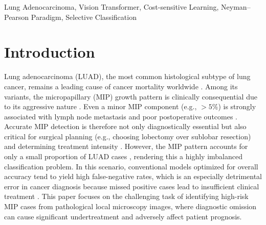 \documentclass[journal,twoside,web]{ieeecolor}
\begin{document}
\begin{abstract}
Accurate detection of the micropapillary (MIP) subtype in lung adenocarcinoma is clinically urgent due to its aggressive behavior and poor prognosis. Deep learning models, however, face deployment barriers from uncertainty and high false-negative rates (FNR). Although our baseline Vision Transformer reaches 93.41\% accuracy, its 16.06\% FNR is clinically unsafe. We first combine cost-sensitive learning (positive:negative = 10:1) with Neyman--Pearson-based threshold calibration to strictly bound the FNR at 5\%, achieving 85.91\% accuracy. We then introduce a selection head for instance-wise confidence and calibrate on a held-out set, yielding a selective classifier that guarantees 95\% per-instance confidence while maintaining FNR 12.91\%, attaining 94.82\% accuracy on 92.51\% of test data. Finally, integrating cost-sensitive learning directly into selective classification with FNR-based threshold selection further reduces FNR to 5.07\%, improves accuracy to 91.79\%, and achieves 91.02\% coverage, thereby offering a practical balance of safety and throughput for clinical deployment.
\end{abstract}

\begin{IEEEkeywords}
Lung Adenocarcinoma, Vision Transformer, Cost-sensitive Learning, Neyman--Pearson Paradigm, Selective Classification
\end{IEEEkeywords}

\section{Introduction}

Lung adenocarcinoma (LUAD), the most common histological subtype of lung cancer, remains a leading cause of cancer mortality worldwide \cite{bray2024global,luo2025estimated}. Among its variants, the micropapillary (MIP) growth pattern is clinically consequential due to its aggressive nature \cite{wang2020both,travis20152015}. Even a minor MIP component (e.g., $>5\%$) is strongly associated with lymph node metastasis and poor postoperative outcomes \cite{caso2020underlying, dai2017tumor}. Accurate MIP detection is therefore not only diagnostically essential but also critical for surgical planning (e.g., choosing lobectomy over sublobar resection) and determining treatment intensity \cite{dai2017tumor}. However, the MIP pattern accounts for only a small proportion of LUAD cases \cite{emoto2019expansion}, rendering this a highly imbalanced classification problem. In this scenario, conventional models optimized for overall accuracy tend to yield high false-negative rates, which is an especially detrimental error in cancer diagnosis because missed positive cases lead to insufficient clinical treatment \cite{araf2024cost}. This paper focuses on the challenging task of identifying high-risk MIP cases from pathological local microscopy images, where diagnostic omission can cause significant undertreatment and adversely affect patient prognosis.
\end{document}
